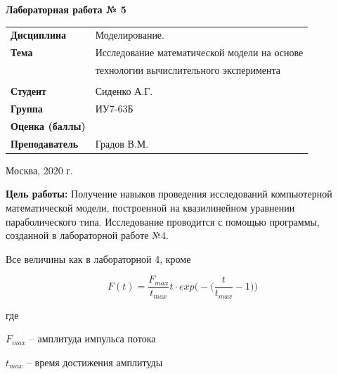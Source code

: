 \documentclass[a4paper,14pt]{extreport} %
\begin{document}
\begin{titlepage}
    \vspace{2cm}

    \begin{center}
        \textbf{Лабораторная работа № 5} \\
        \vspace{0.5cm}
    \end{center}

    \vspace{4cm}

    \begin{flushleft}
        \begin{tabular}{ll}
            \textbf{Дисциплина} & Моделирование.  \\
            \textbf{Тема} & Исследование математической модели на основе \\
            & технологии вычислительного эксперимента \\
            \\
            \textbf{Студент} & Сиденко А.Г. \\
            \textbf{Группа} & ИУ7-63Б \\
            \textbf{Оценка (баллы)} & \\
            \textbf{Преподаватель} & Градов В.М.   \\
        \end{tabular}
    \end{flushleft}

    \vspace{4cm}

   \begin{center}
        Москва, 2020 г.
    \end{center}

\end{titlepage}

\textbf{Цель работы:} Получение навыков проведения исследований компьютерной математической модели, построенной на квазилинейном уравнении параболического типа. Исследование проводится  с помощью программы, созданной в лабораторной работе №4. 

Все величины как в лабораторной 4, кроме

$$F(t)=\frac{F_{max}}{t_{max}}t \cdot exp\bigg(-\bigg(\frac{t}{t_{max}}-1\bigg)\bigg)$$

где

$F_{max}$ -- амплитуда импульса потока 

$t_{max}$ -- время достижения амплитуды

\hfill
\end{document}
